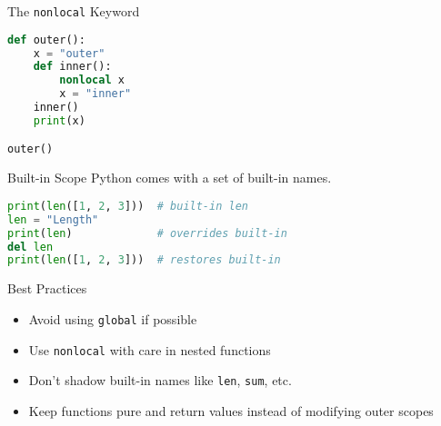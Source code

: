 \begin{frame}[fragile]{The \texttt{nonlocal} Keyword}
\begin{lstlisting}[language=Python]
def outer():
    x = "outer"
    def inner():
        nonlocal x
        x = "inner"
    inner()
    print(x)

outer()
\end{lstlisting}
\end{frame}

\begin{frame}[fragile]{Built-in Scope}
Python comes with a set of built-in names.

\begin{lstlisting}[language=Python]
print(len([1, 2, 3]))  # built-in len
len = "Length"
print(len)             # overrides built-in
del len
print(len([1, 2, 3]))  # restores built-in
\end{lstlisting}
\end{frame}

\begin{frame}{Best Practices}
\begin{itemize}
    \item Avoid using \texttt{global} if possible
    \item Use \texttt{nonlocal} with care in nested functions
    \item Don’t shadow built-in names like \texttt{len}, \texttt{sum}, etc.
    \item Keep functions pure and return values instead of modifying outer scopes
\end{itemize}
\end{frame}

